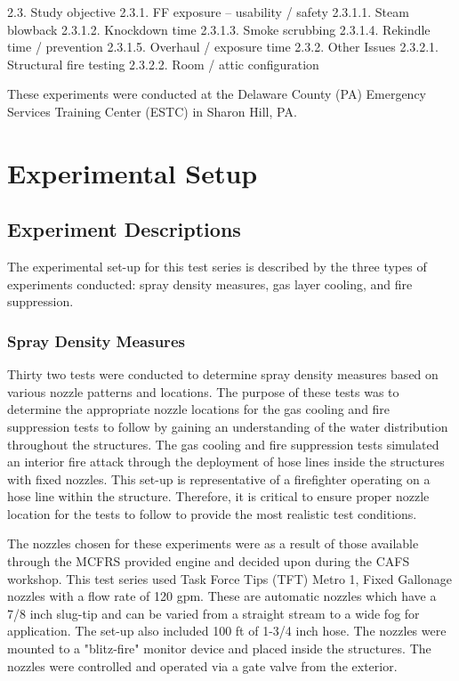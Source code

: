 \documentclass[12pt,oneside]{book}
\begin{document}
2.3. Study objective
2.3.1. FF exposure – usability / safety
2.3.1.1. Steam blowback
2.3.1.2. Knockdown time
2.3.1.3. Smoke scrubbing
2.3.1.4. Rekindle time / prevention
2.3.1.5. Overhaul / exposure time
2.3.2. Other Issues
2.3.2.1. Structural fire testing
2.3.2.2. Room / attic configuration

These experiments were conducted at the Delaware County (PA) Emergency Services Training Center (ESTC) in Sharon Hill, PA.  


\chapter{Experimental Setup}
\label{chap:Experimental_Setup}

\section{Experiment Descriptions}
\label{sec:Experiment_Descriptions}

The experimental set-up for this test series is described by the three types of experiments conducted: spray density measures, gas layer cooling, and fire suppression.

\subsection{Spray Density Measures}
\label{sec:Spray_Density_Measures}

Thirty two tests were conducted to determine spray density measures based on various nozzle patterns and locations. The purpose of these tests was to determine the appropriate nozzle locations for the gas cooling and fire suppression tests to follow by gaining an understanding of the water distribution throughout the structures. The gas cooling and fire suppression tests simulated an interior fire attack through the deployment of hose lines inside the structures with fixed nozzles. This set-up is representative of a firefighter operating on a hose line within the structure. Therefore, it is critical to ensure proper nozzle location for the tests to follow to provide the most realistic test conditions.     

The nozzles chosen for these experiments were as a result of those available through the MCFRS provided engine and decided upon during the CAFS workshop.  This test series used Task Force Tips (TFT) Metro 1, Fixed Gallonage nozzles with a flow rate of 120 gpm. These are automatic nozzles which have a 7/8 inch slug-tip and can be varied from a straight stream to a wide fog for application. The set-up also included 100 ft of 1-3/4 inch hose.  The nozzles were mounted to a "blitz-fire" monitor device and placed inside the structures.  The nozzles were controlled and operated via a gate valve from the exterior. 
\end{document}
